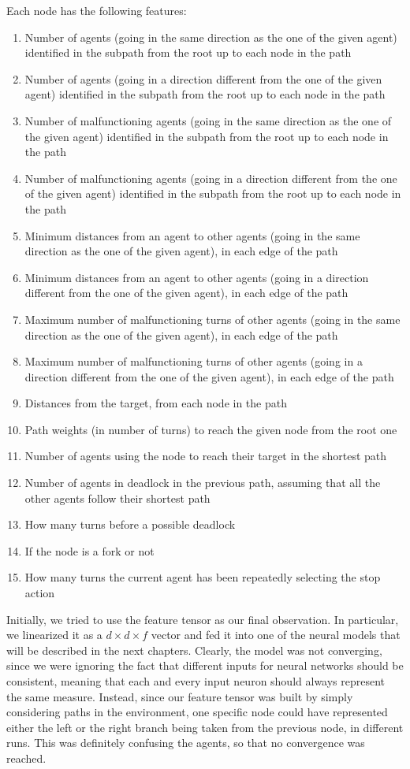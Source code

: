 \documentclass[a4paper,10pt]{report}
\begin{document}
Each node has the following features:
\begin{enumerate}
	\item Number of agents (going in the same direction as the one of the given agent) identified in the subpath from the root up to each node in the path
	\item Number of agents (going in a direction different from the one of the given agent) identified in the subpath from the root up to each node in the path
 	\item Number of malfunctioning agents (going in the same direction as the one of the given agent) identified in the subpath from the root up to each node in the path
	\item Number of malfunctioning agents (going in a direction different from the one of the given agent) identified in the subpath from the root up to each node in the path
	\item Minimum distances from an agent to other agents (going in the same direction as the one of the given agent), in each edge of the path
	\item Minimum distances from an agent to other agents (going in a direction different from the one of the given agent), in each edge of the path
	\item Maximum number of malfunctioning turns of other agents (going in the same direction as the one of the given agent), in each edge of the path
	\item Maximum number of malfunctioning turns of other agents (going in a direction different from the one of the given agent), in each edge of the path
 	\item Distances from the target, from each node in the path
 	\item Path weights (in number of turns) to reach the given node from the root one
 	\item Number of agents using the node to reach their target in the shortest path
 	\item Number of agents in deadlock in the previous path, assuming that all the other agents follow their shortest path
 	\item How many turns before a possible deadlock
 	\item If the node is a fork or not
 	\item How many turns the current agent has been repeatedly selecting the stop action
\end{enumerate}

Initially, we tried to use the feature tensor as our final observation. In particular, we linearized it as a $d\times d \times f$ vector and fed it into one of the neural models that will be described in the next chapters. Clearly, the model was not converging, since we were ignoring the fact that different inputs for neural networks should be consistent, meaning that each and every input neuron should always represent the same measure. Instead, since our feature tensor was built by simply considering paths in the environment, one specific node could have represented either the left or the right branch being taken from the previous node, in different runs. This was definitely confusing the agents, so that no convergence was reached. 
\end{document}
